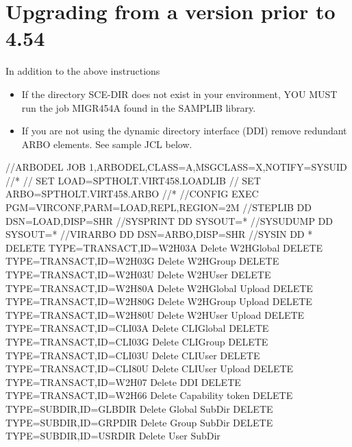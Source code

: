 \documentclass[letterpaper,10pt,english]{sphinxmanual}
\begin{document}

\section{Upgrading from a version prior to 4.54}
\label{\detokenize{Migration_Guide:index-4}}\label{\detokenize{Migration_Guide:upgrading-from-a-version-prior-to-4-54}}
In addition to the above instructions
\begin{itemize}
\item {} 
If the directory SCE-DIR does not exist in your environment, YOU MUST run the job MIGR454A found in the SAMPLIB library.

\item {} 
If you are not using the dynamic directory interface (DDI) remove redundant ARBO elements. See sample JCL below.

\end{itemize}

\begin{sphinxVerbatim}[commandchars=\\\{\}]
//\PYGZdl{}ARBODEL JOB 1,ARBODEL,CLASS=A,MSGCLASS=X,NOTIFY=\PYGZam{}SYSUID
//*
// SET LOAD=SPTHOLT.VIRT458.LOADLIB
// SET ARBO=SPTHOLT.VIRT458.ARBO
//*
//CONFIG  EXEC PGM=VIRCONF,PARM=\PYGZsq{}LOAD,REPL\PYGZsq{},REGION=2M
//STEPLIB  DD  DSN=\PYGZam{}LOAD,DISP=SHR
//SYSPRINT DD  SYSOUT=*
//SYSUDUMP DD  SYSOUT=*
//VIRARBO  DD  DSN=\PYGZam{}ARBO,DISP=SHR
//SYSIN      DD *
 DELETE TYPE=TRANSACT,ID=W2H\PYGZhy{}03A    Delete W2H\PYGZhy{}Global
 DELETE TYPE=TRANSACT,ID=W2H\PYGZhy{}03G    Delete W2H\PYGZhy{}Group
 DELETE TYPE=TRANSACT,ID=W2H\PYGZhy{}03U    Delete W2H\PYGZhy{}User
 DELETE TYPE=TRANSACT,ID=W2H\PYGZhy{}80A    Delete W2H\PYGZhy{}Global Upload
 DELETE TYPE=TRANSACT,ID=W2H\PYGZhy{}80G    Delete W2H\PYGZhy{}Group Upload
 DELETE TYPE=TRANSACT,ID=W2H\PYGZhy{}80U    Delete W2H\PYGZhy{}User Upload
 DELETE TYPE=TRANSACT,ID=CLI\PYGZhy{}03A    Delete CLI\PYGZhy{}Global
 DELETE TYPE=TRANSACT,ID=CLI\PYGZhy{}03G    Delete CLI\PYGZhy{}Group
 DELETE TYPE=TRANSACT,ID=CLI\PYGZhy{}03U    Delete CLI\PYGZhy{}User
 DELETE TYPE=TRANSACT,ID=CLI\PYGZhy{}80U    Delete CLI\PYGZhy{}User Upload
 DELETE TYPE=TRANSACT,ID=W2H\PYGZhy{}07     Delete DDI
 DELETE TYPE=TRANSACT,ID=W2H\PYGZhy{}66     Delete Capability token
 DELETE TYPE=SUBDIR,ID=GLB\PYGZhy{}DIR      Delete Global Sub\PYGZhy{}Dir
 DELETE TYPE=SUBDIR,ID=GRP\PYGZhy{}DIR      Delete Group Sub\PYGZhy{}Dir
 DELETE TYPE=SUBDIR,ID=USR\PYGZhy{}DIR      Delete User Sub\PYGZhy{}Dir
\end{sphinxVerbatim}
\end{document}
